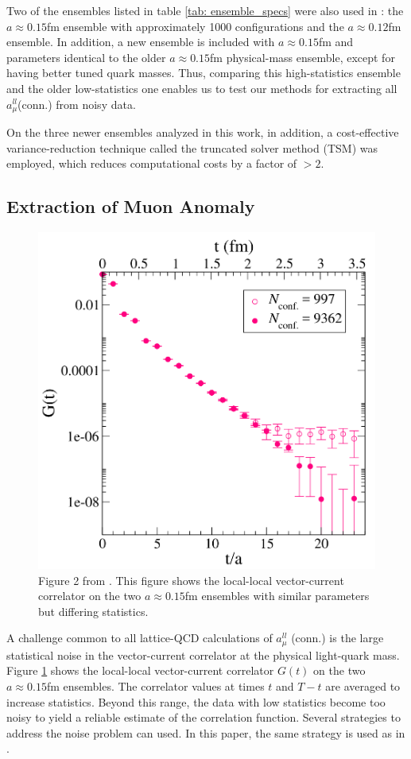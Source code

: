 \documentclass[
a4paper,
10pt,
twoside,
prd,
aps,
nofootinbib,
superscriptaddress,
floatfix,
preprintnumbers,
]{article}
\begin{document}
Two of the ensembles listed in table \ref{tab: ensemble_specs} were also used in \cite{PhysRevD.96.034516}:
the $a \approx 0.15$fm ensemble with approximately 1000 configurations and the $a \approx 0.12$fm ensemble.
In addition, a new ensemble is included with $a \approx 0.15$fm and parameters identical to the older $a \approx 0.15$fm physical-mass ensemble, except for having better tuned quark masses.
Thus, comparing this high-statistics ensemble and the older low-statistics one enables us to test our methods for extracting all $ a_\mu^{ll}$(conn.) from noisy data.

On the three newer ensembles analyzed in this work, in addition, a cost-effective variance-reduction technique called the truncated solver method (TSM) was employed, which reduces computational costs by a factor of $>2$.


\subsection{Extraction of Muon Anomaly}
\label{sec: LatCalcB}
\begin{figure}[H]
	\centering
	\includegraphics[width=0.75\linewidth]{figures/paperFig2.png}
	\captionsetup{width=0.8\linewidth}
	\caption{%
	Figure 2 from \cite{Davies_2020}.
	This figure shows the local-local vector-current correlator on the two $a \approx 0.15$fm ensembles with similar parameters but differing statistics.
	}
	\label{fig: paperFig2}
\end{figure}

A challenge common to all lattice-QCD calculations
of $a_\mu^{ll}$ (conn.) is the large statistical noise in the vector-current correlator at the physical light-quark mass.
Figure \ref{fig: paperFig2} shows the local-local vector-current correlator $G(t)$ on the two $a \approx 0.15$fm ensembles.
The correlator values at times $t$ and $T-t$ are averaged to increase statistics.
Beyond this range, the data with low statistics become too noisy to yield a reliable estimate of the correlation function.
Several strategies to address the noise problem can used.
In this paper, the same strategy is used as in \cite{PhysRevD.96.034516}.
\end{document}

